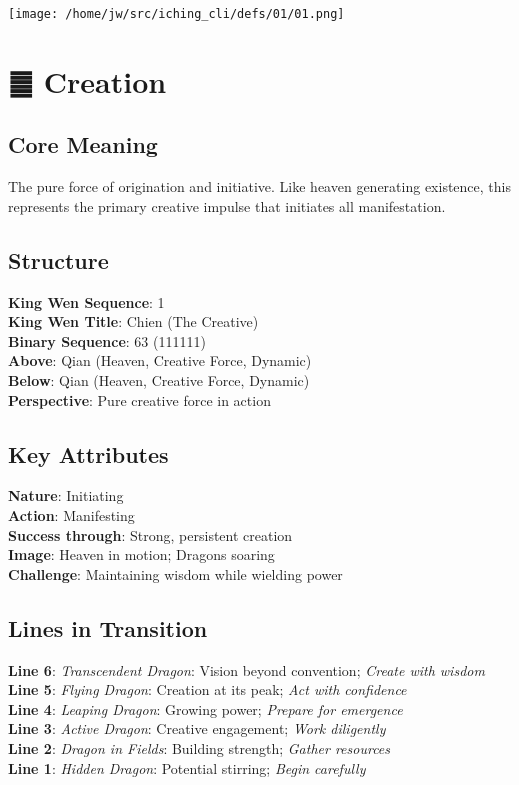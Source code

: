 \documentclass[
]{article}
\author{}
\date{}
\begin{document}
\texttt{[image: /home/jw/src/iching\_cli/defs/01/01.png]}

\section{䷀ Creation}\label{ux4dc0-creation}

\subsection{Core Meaning}\label{core-meaning}

The pure force of origination and initiative. Like heaven generating
existence, this represents the primary creative impulse that initiates
all manifestation.

\subsection{Structure}\label{structure}

\textbf{King Wen Sequence}: 1\\
\textbf{King Wen Title}: Ch\textquotesingle ien (The Creative)\\
\textbf{Binary Sequence}: 63 (111111)\\
\textbf{Above}: Qian (Heaven, Creative Force, Dynamic)\\
\textbf{Below}: Qian (Heaven, Creative Force, Dynamic)\\
\textbf{Perspective}: Pure creative force in action

\subsection{Key Attributes}\label{key-attributes}

\textbf{Nature}: Initiating\\
\textbf{Action}: Manifesting\\
\textbf{Success through}: Strong, persistent creation\\
\textbf{Image}: Heaven in motion; Dragons soaring\\
\textbf{Challenge}: Maintaining wisdom while wielding power

\subsection{Lines in Transition}\label{lines-in-transition}

\textbf{Line 6}: \emph{Transcendent Dragon}: Vision beyond convention;
\emph{Create with wisdom}\\
\textbf{Line 5}: \emph{Flying Dragon}: Creation at its peak; \emph{Act
with confidence}\\
\textbf{Line 4}: \emph{Leaping Dragon}: Growing power; \emph{Prepare for
emergence}\\
\textbf{Line 3}: \emph{Active Dragon}: Creative engagement; \emph{Work
diligently}\\
\textbf{Line 2}: \emph{Dragon in Fields}: Building strength;
\emph{Gather resources}\\
\textbf{Line 1}: \emph{Hidden Dragon}: Potential stirring; \emph{Begin
carefully}
\end{document}
